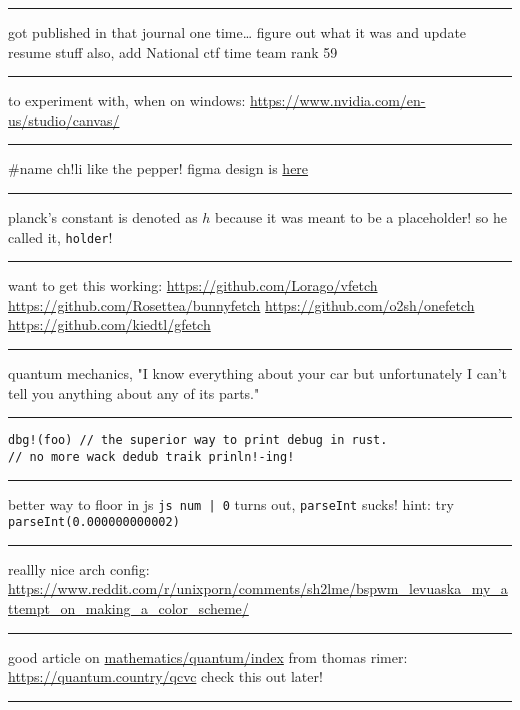 \documentclass[letterpaper]{article}
\begin{document}
\noindent\rule{\textwidth}{0.5pt}

got published in that journal one time\ldots{} figure out what it was and
update resume stuff also, add National ctf time team rank 59

\noindent\rule{\textwidth}{0.5pt}

to experiment with, when on windows:
\url{https://www.nvidia.com/en-us/studio/canvas/}

\noindent\rule{\textwidth}{0.5pt}

\#name ch!li like the pepper! figma design is
\href{https://www.figma.com/file/Z3qcCiUBVYOY8MZwlc6yS1/ch!li?node-id=0\%3A1}{here}

\noindent\rule{\textwidth}{0.5pt}

planck's constant is denoted as \(h\) because it was meant to be a
placeholder! so he called it, \texttt{holder}!

\noindent\rule{\textwidth}{0.5pt}

want to get this working: \url{https://github.com/Lorago/vfetch}
\url{https://github.com/Rosettea/bunnyfetch} \url{https://github.com/o2sh/onefetch}
\url{https://github.com/kiedtl/gfetch}

\noindent\rule{\textwidth}{0.5pt}

quantum mechanics, "I know everything about your car but unfortunately I
can't tell you anything about any of its parts."

\noindent\rule{\textwidth}{0.5pt}

\begin{verbatim}
dbg!(foo) // the superior way to print debug in rust.
// no more wack dedub traik prinln!-ing!
\end{verbatim}

\noindent\rule{\textwidth}{0.5pt}

better way to floor in js \texttt{js num | 0} turns out, \texttt{parseInt} sucks!
hint: try \texttt{parseInt(0.000000000002)}

\noindent\rule{\textwidth}{0.5pt}

reallly nice arch config:
\url{https://www.reddit.com/r/unixporn/comments/sh2lme/bspwm\_levuaska\_my\_attempt\_on\_making\_a\_color\_scheme/}

\noindent\rule{\textwidth}{0.5pt}

good article on
\href{mathematics/quantum/index.org}{mathematics/quantum/index} from
thomas rimer: \url{https://quantum.country/qcvc} check this out later!

\noindent\rule{\textwidth}{0.5pt}
\end{document}
